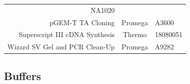 \documentclass[11pt,singlespacinge,twoside]{reedthesis} %
\theoremstyle{definition}
\theoremstyle{definition}
\theoremstyle{definition}
\theoremstyle{remark}
\begin{document}
\begin{longtable}[]{@{}rcl@{}}
\begin{minipage}[t]{0.16\columnwidth}
NA1020\strut
\end{minipage}\tabularnewline
\begin{minipage}[t]{0.50\columnwidth}\raggedleft
pGEM-T TA Cloning\strut
\end{minipage} & \begin{minipage}[t]{0.26\columnwidth}\centering
Promega\strut
\end{minipage} & \begin{minipage}[t]{0.16\columnwidth}\raggedright
A3600\strut
\end{minipage}\tabularnewline
\begin{minipage}[t]{0.50\columnwidth}\raggedleft
Superscript III cDNA Synthesis\strut
\end{minipage} & \begin{minipage}[t]{0.26\columnwidth}\centering
Thermo\strut
\end{minipage} & \begin{minipage}[t]{0.16\columnwidth}\raggedright
18080051\strut
\end{minipage}\tabularnewline
\begin{minipage}[t]{0.50\columnwidth}\raggedleft
Wizard SV Gel and PCR Clean-Up\strut
\end{minipage} & \begin{minipage}[t]{0.26\columnwidth}\centering
Promega\strut
\end{minipage} & \begin{minipage}[t]{0.16\columnwidth}\raggedright
A9282\strut
\end{minipage}\tabularnewline
\bottomrule
\end{longtable}
\hypertarget{mat-buff}{%
\subsection{Buffers}\label{mat-buff}}
\end{document}
